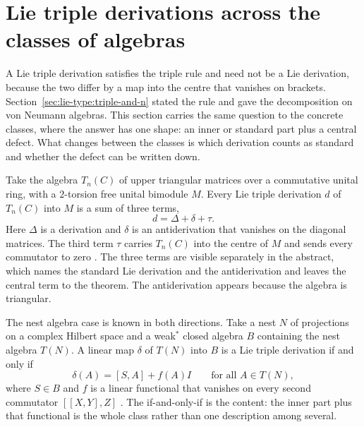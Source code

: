 \section{Lie triple derivations across the classes of algebras}\label{sec:lie-type:triple-across-classes}

A Lie triple derivation satisfies the triple rule and need not be a Lie
derivation, because the two differ by a map into the centre that vanishes on
brackets.
Section~\ref{sec:lie-type:triple-and-n} stated the rule and gave the
decomposition on von Neumann algebras.
This section carries the same question to the concrete classes, where the answer
has one shape: an inner or standard part plus a central defect. What changes
between the classes is which derivation counts as standard and whether the defect
can be written down.

Take the algebra $T_{n}(C)$ of upper triangular matrices over a commutative
unital ring, with a $2$-torsion free unital bimodule $M$.
Every Lie triple derivation $d$ of $T_{n}(C)$ into $M$ is a sum of three terms,
\begin{equation*}
  d = \Delta + \delta + \tau .
\end{equation*}
Here $\Delta$ is a derivation and $\delta$ is an antiderivation that vanishes on
the diagonal matrices. The third term $\tau$ carries $T_{n}(C)$ into the centre
of $M$ and sends every commutator to zero
\cite[Theorem~2.4, p.~823]{Benkovic2011TripleTriangular}.
The three terms are visible separately in the abstract, which names the standard
Lie derivation and the antiderivation and leaves the central term to the theorem.
The antiderivation appears because the algebra is triangular.

The nest algebra case is known in both directions. Take a nest $N$ of projections
on a complex Hilbert space and a weak$^{\ast}$ closed algebra $B$ containing the
nest algebra $T(N)$.
A linear map $\delta$ of $T(N)$ into $B$ is a Lie triple derivation if and only if
\begin{equation*}
  \delta(A) = [S,A] + f(A)I \qquad \text{for all } A \in T(N),
\end{equation*}
where $S \in B$ and $f$ is a linear functional that vanishes on every second
commutator $[[X,Y],Z]$ \cite[Theorem~1.1, p.~882]{Lu2007LieTripleNest}.
The if-and-only-if is the content: the inner part plus that functional is the
whole class rather than one description among several.

